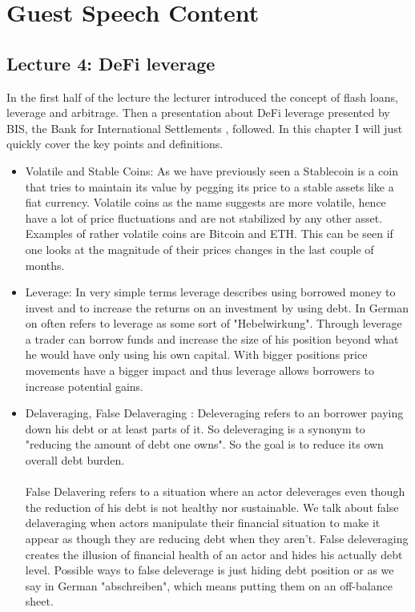 \documentclass{article}
\begin{document}

\section{Guest Speech Content}

\subsection{Lecture 4: DeFi leverage }

In the first half of the lecture the lecturer introduced the concept of flash loans, leverage and arbitrage. Then a presentation about DeFi leverage presented by BIS, the Bank for International Settlements , followed. In this chapter I will just quickly cover the key points and definitions. 
\begin{itemize}

\item {Volatile and Stable Coins}: As we have previously seen a Stablecoin is a coin that tries to  maintain its value by pegging its price to a stable assets like a fiat currency. Volatile coins as the name suggests are more volatile, hence have a lot of price fluctuations and are not stabilized by any other asset. Examples of rather volatile coins are Bitcoin and ETH. This can be seen if one looks at the magnitude of their prices changes in the last couple of months.%

\item {Leverage}: In very simple terms leverage describes using borrowed money to invest and to increase the returns on an investment by using debt. In German on often refers to leverage as some sort of "Hebelwirkung". Through leverage a trader can borrow funds and increase the size of his position beyond what he would have only using his own capital. With bigger positions price movements have a bigger impact and thus leverage allows borrowers to increase potential gains.


\item {Delaveraging, False Delaveraging }: Deleveraging refers to an borrower paying down his debt or at least parts of it. So deleveraging is a synonym to "reducing the amount of debt one owns". So the goal is to reduce its own overall debt burden.\\
\\
False Delavering refers to a situation where an actor deleverages even though the reduction of his debt is not healthy nor sustainable. We talk about false delaveraging when actors manipulate their financial situation to make it appear as though they are reducing debt when they aren't. False deleveraging creates the illusion of financial health of an actor and hides his actually debt level.
Possible ways to false deleverage is just hiding debt position or as we say in German "abschreiben", which means putting them on an off-balance sheet.


\end{itemize}
\end{document}
